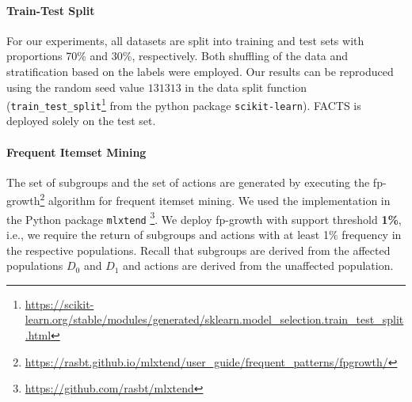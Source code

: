 \documentclass{article}
\begin{document}
\paragraph{Train-Test Split} %
For our experiments, all datasets are split into training and test sets with proportions 70\% and 30\%, respectively. Both shuffling of the data and stratification based on the labels were employed.
Our results can be reproduced using the random seed value $131313$ in the data split function (\verb|train_test_split|\footnote{\url{https://scikit-learn.org/stable/modules/generated/sklearn.model_selection.train_test_split.html}} from the python package \verb|scikit-learn|). FACTS is deployed solely on the test set.





\paragraph{Frequent Itemset Mining}
The set of subgroups and the set of actions are generated by executing the fp-growth\footnote{\url{https://rasbt.github.io/mlxtend/user_guide/frequent_patterns/fpgrowth/}} algorithm for frequent itemset mining. We used the implementation in the Python package \verb|mlxtend| \footnote{\url{https://github.com/rasbt/mlxtend}}. We deploy fp-growth with support threshold \textbf{1\%}, i.e., we require the return of subgroups and actions with at least 1\% frequency in the respective populations. Recall that subgroups are derived from the affected populations $D_0$ and $D_1$ and actions are derived from the unaffected population.
\end{document}
